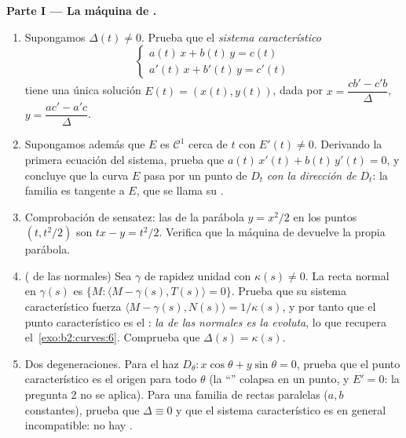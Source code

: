 \begin{problem}
\medskip
\noindent\textbf{Parte I --- La máquina de .}
\begin{enumerate}
  \item Supongamos $\Delta(t) \neq 0$. Prueba que el \emph{sistema
        característico}
        \[
        \begin{cases} a(t)\,x + b(t)\,y = c(t)\\
        a'(t)\,x + b'(t)\,y = c'(t)\end{cases}
        \]
        tiene una única solución $E(t) = (x(t), y(t))$, dada por $x
        = \dfrac{cb' - c'b}{\Delta}$, $y = \dfrac{ac' -
        a'c}{\Delta}$.
  \item Supongamos además que $E$ es $\mathcal C^1$ cerca de $t$ con
        $E'(t) \neq 0$. Derivando la primera ecuación del sistema,
        prueba que $a(t)\,x'(t) + b(t)\,y'(t) = 0$, y concluye que
        la curva $E$ pasa por un punto de $D_t$ \emph{con la
        dirección de} $D_t$: la familia es tangente a $E$, que se
        llama su \emph{}.
  \item Comprobación de sensatez: las  de la parábola
        $y = x^2/2$ en los puntos $(t, t^2/2)$ son $tx - y = t^2/2$.
        Verifica que la máquina de  devuelve la propia
        parábola.
  \item ( de las normales) Sea $\gamma$ de rapidez unidad
        con $\kappa(s) \neq 0$. La recta normal en $\gamma(s)$ es
        $\{M : \langle M - \gamma(s), T(s) \rangle = 0\}$. Prueba
        que su sistema característico fuerza $\langle M - \gamma(s),
        N(s)\rangle = 1/\kappa(s)$, y por tanto que el punto
        característico es el : \emph{la
         de las normales es la evoluta}, lo que recupera el~\cref{exo:b2:curves:6}. Comprueba que $\Delta(s) =
        \kappa(s)$.
  \item Dos degeneraciones. Para el haz $D_\theta : x\cos \theta +
        y\sin\theta = 0$, prueba que el punto característico es el
        origen para todo $\theta$ (la ``'' colapsa en un
        punto, y $E' = 0$: la pregunta 2 no se aplica). Para una
        familia de rectas paralelas ($a, b$ constantes), prueba que
        $\Delta \equiv 0$ y que el sistema característico es en
        general incompatible: no hay .
\end{enumerate}


\end{problem}
